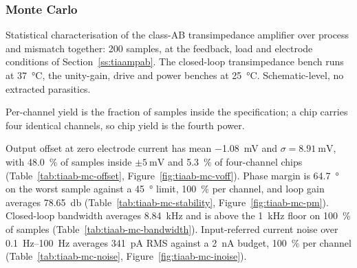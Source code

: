 %
%

\subsubsection{Monte Carlo}\label{sss:tiaampab-mc}

Statistical characterisation of the class-AB transimpedance amplifier over process
and mismatch together: 200 samples, at the feedback, load and electrode conditions of
Section~\ref{ss:tiaampab}. The closed-loop transimpedance bench runs at
\SI{37}{\celsius}, the unity-gain, drive and power benches at \SI{25}{\celsius}.
Schematic-level, no extracted parasitics.

Per-channel yield is the fraction of samples inside the specification; a chip carries
four identical channels, so chip yield is the fourth power.

Output offset at zero electrode current has mean \SI{-1.08}{\milli\volt} and
$\sigma = \SI{8.91}{\milli\volt}$, with \SI{48.0}{\percent} of samples inside
\(\pm\SI{5}{\milli\volt}\) and \SI{5.3}{\percent} of four-channel chips
(Table~\ref{tab:tiaab-mc-offset}, Figure~\ref{fig:tiaab-mc-voff}). Phase margin is
\SI{64.7}{\degree} on the worst sample against a \SI{45}{\degree} limit,
\SI{100}{\percent} per channel, and loop gain averages \SI{78.65}{\decibel}
(Table~\ref{tab:tiaab-mc-stability}, Figure~\ref{fig:tiaab-mc-pm}). Closed-loop
bandwidth averages \SI{8.84}{\kilo\hertz} and is above the \SI{1}{\kilo\hertz} floor
on \SI{100}{\percent} of samples (Table~\ref{tab:tiaab-mc-bandwidth}).
Input-referred current noise over \SIrange{0.1}{100}{\hertz} averages
\SI{341}{\pico\ampere} RMS against a \SI{2}{\nano\ampere} budget,
\SI{100}{\percent} per channel (Table~\ref{tab:tiaab-mc-noise},
Figure~\ref{fig:tiaab-mc-inoise}).
